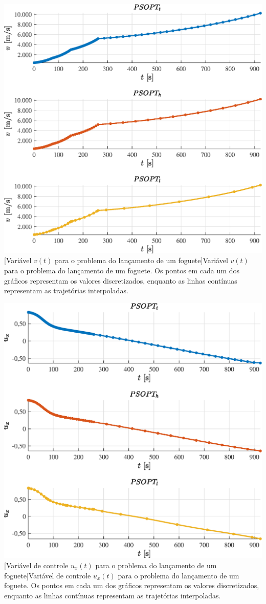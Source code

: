 \noindent
\begin{minipage}{\textwidth}
	\vspace{\onelineskip}
	\centering
	\includegraphics[width=0.7\linewidth]{fig/resultados/foguete/traj/x/v}
	[Variável $v(t)$ para o problema do lançamento de um foguete]{Variável $v(t)$ para o problema do lançamento de um foguete. Os pontos em cada um dos gráficos representam os valores discretizados, enquanto as linhas contínuas representam as trajetórias interpoladas.}
	\label{fig:foguete:x:v}
	\vspace{\onelineskip}
\end{minipage}

\noindent
\begin{minipage}{\textwidth}
	\vspace{\onelineskip}
	\centering
	\includegraphics[width=0.7\linewidth]{fig/resultados/foguete/traj/u/u1}
	[Variável de controle $u_x(t)$ para o problema do lançamento de um foguete]{Variável de controle $u_x(t)$ para o problema do lançamento de um foguete. Os pontos em cada um dos gráficos representam os valores discretizados, enquanto as linhas contínuas representam as trajetórias interpoladas.}
	\label{fig:foguete:u:u_x}
	\vspace{\onelineskip}
\end{minipage}

